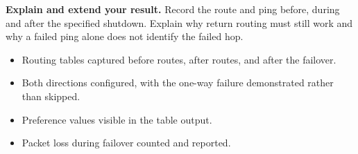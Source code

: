 \begin{verification}
\textbf{Explain and extend your result.} Record the route and ping before, during and after the specified shutdown. Explain why return routing must still work and why a failed ping alone does not identify the failed hop.


\begin{itemize}
  \item Routing tables captured before routes, after routes, and after the failover.
  \item Both directions configured, with the one-way failure demonstrated rather than skipped.
  \item Preference values visible in the table output.
  \item Packet loss during failover counted and reported.
\end{itemize}
\end{verification}
